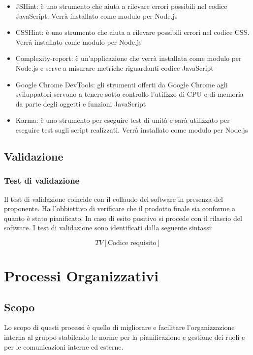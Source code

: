 \begin{itemize}
	\item  JSHint: è uno strumento che aiuta a rilevare errori possibili nel codice JavaScript. Verrà installato come modulo per Node.js
	\item  CSSHint: è uno strumento che aiuta a rilevare possibili errori nel codice CSS. Verrà installato come modulo per Node.js
	\item  Complexity-report: è un’applicazione che verrà installata come modulo per Node.js e serve a misurare metriche riguardanti codice JavaScript
	\item  Google Chrome DevTools: gli strumenti offerti da Google Chrome agli sviluppatori servono a tenere sotto controllo l’utilizzo di CPU e di memoria da parte degli oggetti e funzioni JavaScript
	\item  Karma: è uno strumento per eseguire test di unità e sarà utilizzato
	per eseguire test sugli script realizzati. Verrà installato come
	modulo per Node.js
\end{itemize}


\subsection{Validazione}

\subsubsection{Test di validazione}
Il test di validazione coincide con il collaudo del software in
presenza del proponente. Ha l’obbiettivo di verificare che il prodotto finale sia conforme a quanto è stato pianificato. In caso di esito positivo si procede con il
rilascio del software. I test di validazione sono identificati dalla
seguente sintassi: 

$$ TV[\text{Codice requisito}] $$

\section{Processi Organizzativi}

\subsection{Scopo}
Lo scopo di questi processi è quello di migliorare e facilitare l’organizzazione interna al gruppo stabilendo le norme per la pianificazione e gestione dei ruoli e per le comunicazioni interne ed esterne.
